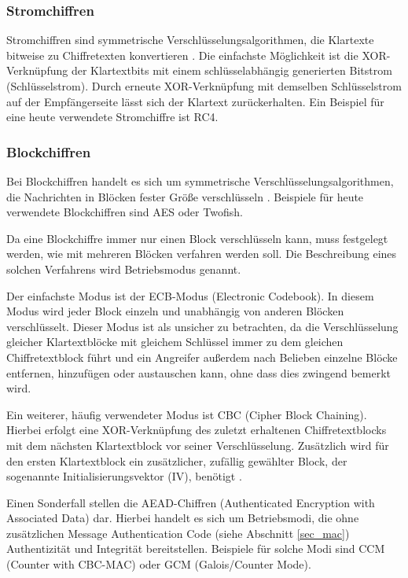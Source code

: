 \subsubsection{Stromchiffren}

Stromchiffren sind symmetrische Verschlüsselungsalgorithmen, die Klartexte bitweise zu Chiffretexten konvertieren \cite{Schneier2006}. Die einfachste Möglichkeit ist die XOR-Verknüpfung der Klartextbits mit einem schlüsselabhängig generierten Bitstrom (Schlüsselstrom). Durch erneute XOR-Verknüpfung mit demselben Schlüsselstrom auf der Empfängerseite lässt sich der Klartext zurückerhalten. Ein Beispiel für eine heute verwendete Stromchiffre ist RC4.

\subsubsection{Blockchiffren}

\label{sec_block_cipher}

Bei Blockchiffren handelt es sich um symmetrische Verschlüsselungsalgorithmen, die Nachrichten in Blöcken fester Größe verschlüsseln \cite{Schneier2006}. Beispiele für heute verwendete Blockchiffren sind AES oder Twofish.

Da eine Blockchiffre immer nur einen Block verschlüsseln kann, muss festgelegt werden, wie mit mehreren Blöcken verfahren werden soll. Die Beschreibung eines solchen Verfahrens wird Betriebsmodus genannt.

Der einfachste Modus ist der ECB-Modus (Electronic Codebook). In diesem Modus wird jeder Block einzeln und unabhängig von anderen Blöcken verschlüsselt. Dieser Modus ist als unsicher zu betrachten, da die Verschlüsselung gleicher Klartextblöcke mit gleichem Schlüssel immer zu dem gleichen Chiffretextblock führt und ein Angreifer außerdem nach Belieben einzelne Blöcke entfernen, hinzufügen oder austauschen kann, ohne dass dies zwingend bemerkt wird.

Ein weiterer, häufig verwendeter Modus ist CBC (Cipher Block Chaining). Hierbei erfolgt eine XOR-Verknüpfung des zuletzt erhaltenen Chiffretextblocks mit dem nächsten Klartextblock vor seiner Verschlüsselung. Zusätzlich wird für den ersten Klartextblock ein zusätzlicher, zufällig gewählter Block, der sogenannte Initialisierungsvektor (IV), benötigt \cite{Schneier2006}.

Einen Sonderfall stellen die AEAD-Chiffren (Authenticated Encryption with Associated Data) dar. Hierbei handelt es sich um Betriebsmodi, die ohne zusätzlichen Message Authentication Code (siehe Abschnitt \ref{sec_mac}) Authentizität und Integrität bereitstellen. Beispiele für solche Modi sind CCM (Counter with CBC-MAC) oder GCM (Galois/Counter Mode). 

